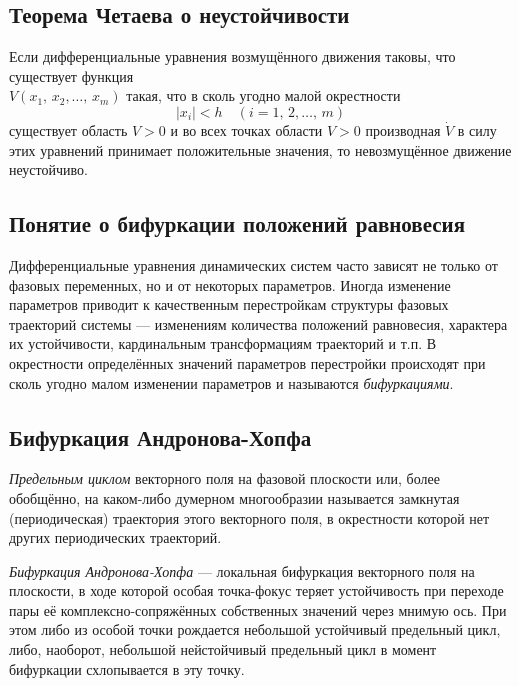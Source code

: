 \documentclass[a4paper]{article}
\begin{document}
\subsection{Теорема Четаева о неустойчивости}
\begin{thm}
	Если дифференциальные уравнения возмущённого движения таковы, что
	существует функция\\$V(x_1,\,x_2,\ldots,\,x_m)$
	такая, что в сколь угодно
	малой  окрестности
	 \[
		 |x_i|<h \quad (i=1,\,2,\ldots,\,m)
	\] 
	существует область $V>0$ и во всех точках области $V>0$ производная
	$\dot{V}$ в силу этих уравнений принимает положительные значения, то
	невозмущённое движение неустойчиво.
\end{thm}
\subsection{Понятие о бифуркации положений равновесия}
Дифференциальные уравнения динамических систем часто зависят не только от
фазовых переменных, но и от некоторых параметров.
Иногда изменение параметров приводит к качественным перестройкам  структуры
фазовых траекторий системы --- изменениям количества положений равновесия,
характера их устойчивости, кардинальным трансформациям траекторий и т.\;п.
В окрестности определённых значений параметров перестройки происходят при
сколь угодно малом изменении параметров и называются \emph{бифуркациями}.
\subsection{Бифуркация Андронова-Хопфа}
\begin{dfn}
	\emph{Предельным циклом} векторного поля на фазовой плоскости или,
	более обобщённо, на каком-либо думерном многообразии называется
	замкнутая (периодическая) траектория этого векторного поля, в
	окрестности которой нет других периодических траекторий.
\end{dfn}
\begin{dfn}
	\emph{Бифуркация Андронова-Хопфа} --- локальная бифуркация векторного
	поля на плоскости, в ходе которой особая точка-фокус теряет
	устойчивость при переходе пары её комплексно-сопряжённых собственных
	значений через мнимую ось. При этом либо из особой точки рождается
	небольшой устойчивый предельный цикл, либо, наоборот, небольшой
	нейстойчивый предельный цикл в момент бифуркации схлопывается в эту
	точку.
\end{dfn}
\end{document}
